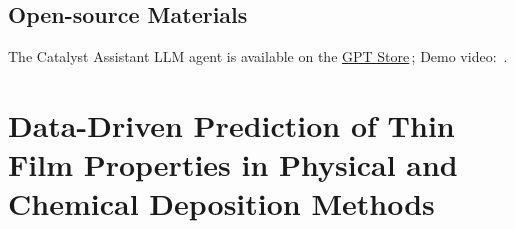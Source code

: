 
\subsection*{Open-source Materials}

The Catalyst Assistant LLM agent is available on the \href{https://chatgpt.com/g/g-68c09896f11c81918e86b7ddcbad47e3-catalyst-assistant}{GPT Store}\,; Demo video: \,.








\section{Data-Driven Prediction of Thin Film Properties in Physical and Chemical Deposition Methods}

